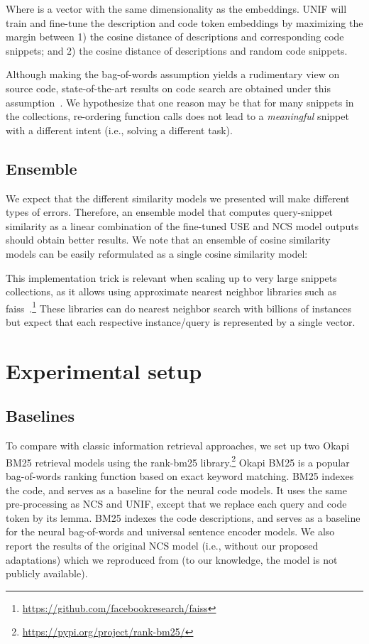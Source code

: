 \documentclass[12pt,conference, onecolumn]{IEEEtran}
\begin{document}
Where  is a vector with the same dimensionality as the embeddings.  UNIF will train  and fine-tune the description and code token embeddings by maximizing the margin between 1) the cosine distance of descriptions and corresponding code snippets; and 2) the cosine distance of descriptions and random code snippets. 

Although making the bag-of-words assumption yields a rudimentary view on source code, state-of-the-art results on code search are obtained under this assumption~\cite{sachdev2018retrieval, cambronero2019deep, husain2019codesearchnet}. We hypothesize that one reason may be that for many snippets in the collections, re-ordering function calls does not lead to a \textit{meaningful} snippet with a different intent (i.e., solving a different task).

\subsection{Ensemble}\label{sec:ensemble}
We expect that the different similarity models we presented will make different types of errors. Therefore,  an ensemble model that computes query-snippet similarity as a linear combination of the fine-tuned USE and NCS model outputs should obtain better results. We note that an ensemble of cosine similarity models can be easily reformulated as a single cosine similarity model:



This implementation trick is relevant when scaling up to very large snippets collections, as it allows using approximate nearest neighbor libraries such as faiss~\cite{JDH17}.\footnote{\url{https://github.com/facebookresearch/faiss}} These libraries can do nearest neighbor search with billions of instances but expect that each respective instance/query is represented by a single vector. 
 
\section{Experimental setup}

\subsection{Baselines}
To compare with classic information retrieval approaches, we set up two Okapi BM25 retrieval models using the rank-bm25 library.\footnote{\url{https://pypi.org/project/rank-bm25/}} Okapi BM25 is a popular bag-of-words ranking function based on exact keyword matching. BM25 indexes the code, and serves as a baseline for the neural code models. It uses the same pre-processing as NCS and UNIF, except that we replace each query and code token by its lemma. BM25 indexes the code descriptions, and serves as a baseline for the neural bag-of-words and universal sentence encoder models. We also report the results of the original NCS model (i.e., without our proposed adaptations) which we reproduced from \cite{sachdev2018retrieval} (to our knowledge, the model is not publicly available).
\end{document}

